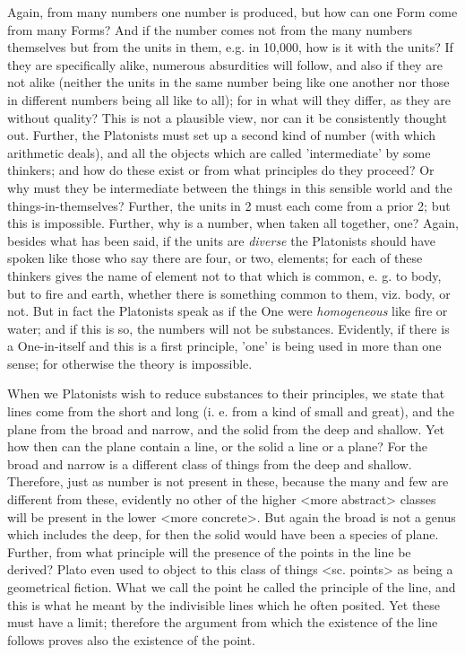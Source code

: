 Again, from many numbers one number is produced, but how can one Form come from many Forms? And if the number comes not from the many numbers themselves but from the units in them, e.g. in 10,000, how is it with the units? If they are specifically alike, numerous absurdities will follow, and also if they are not alike (neither the units in the same number being like one another nor those in different numbers being all like to all); for in what will they differ, as they are without quality? This is not a plausible view, nor can it be consistently thought out. Further, the Platonists must set up a second kind of number (with which arithmetic deals), and all the objects which are called 'intermediate' by some thinkers; and how do these exist or from what principles do they proceed? Or why must they be intermediate between the things in this sensible world and the things-in-themselves? Further, the units in 2 must each come from a prior 2; but this is impossible. Further, why is a number, when taken all together, one? Again, besides what has been said, if the units are \emph{diverse} the Platonists should have spoken like those who say there are four, or two, elements; for each of these thinkers gives the name of element not to that which is common, e. g. to body, but to fire and earth, whether there is something common to them, viz. body, or not. But in fact the Platonists speak as if the One were \emph{homogeneous} like fire or water; and if this is so, the numbers will not be substances. Evidently, if there is a One-in-itself and this is a first principle, 'one' is being used in more than one sense; for otherwise the theory is impossible.

When we Platonists wish to reduce substances to their principles, we state that lines come from the short and long (i. e. from a kind of small and great), and the plane from the broad and narrow, and the solid from the deep and shallow. Yet how then can the plane contain a line, or the solid a line or a plane? For the broad and narrow is a different class of things from the deep and shallow. Therefore, just as number is not present in these, because the many and few are different from these, evidently no other of the higher <more abstract> classes will be present in the lower <more concrete>. But again the broad is not a genus which includes the deep, for then the solid would have been a species of plane. Further, from what principle will the presence of the points in the line be derived? Plato even used to object to this class of things <sc. points> as being a geometrical fiction. What we call the point he called the principle of the line, and this is what he meant by the indivisible lines which he often posited. Yet these must have a limit; therefore the argument from which the existence of the line follows proves also the existence of the point.

